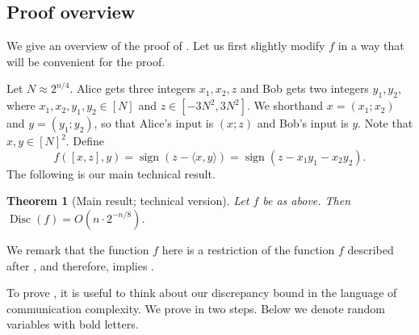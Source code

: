 \documentclass[11pt]{article}
\numberwithin{equation}{section}
\newtheorem{theorem}{Theorem}[section]
\theoremstyle{definition}
\theoremstyle{plain}
\theoremstyle{definition}\newtheorem{problem}[theorem]{Problem}\theoremstyle{plain}
\DeclareMathOperator{\Disc}{Disc}
\DeclareMathOperator{\sign}{sign}
\newcommand{\pair}[2]{( #1; #2 )}
\begin{document}
\subsection{Proof overview}
%
We give an overview of the proof of .  %
Let us first slightly modify $f$ in a way that will be convenient for the proof.

Let $N \approx 2^{n/4}$. Alice gets three integers $x_1,x_2,z$ and Bob gets two integers $y_1,y_2$, where $x_1,x_2,y_1,y_2 \in [N]$ and $z \in [-3N^2, 3N^2]$. We shorthand $x=\pair{x_1}{x_2}$ and $y=\pair{y_1}{y_2}$, so that Alice's input is $\pair{x}{z}$ and Bob's input is $y$. Note that $x,y \in [N]^2$.
Define
$$
f([x,z],y) =\sign(z-\langle x,y \rangle) = \sign(z - x_1 y_1 - x_2 y_2).
$$
The following is our main technical result.
\begin{theorem}[Main result; technical version]
\label{thm:disc}
Let $f$ be as above. Then $\Disc(f) = O(n \cdot 2^{-n/8})$.
\end{theorem}

We remark that the function $f$ here is a restriction of the function $f$ described after , and therefore,  implies .

To prove , it is useful to think about our discrepancy bound in the language of communication complexity. We prove  in two steps. Below we denote random variables with bold letters.
\end{document}

